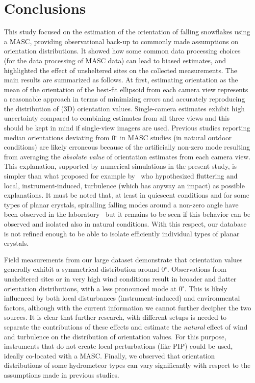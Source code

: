 \documentclass[draft]{agujournal2019}
\begin{document}
\section{Conclusions}
This study focused on the estimation of the orientation of falling snowflakes using a MASC, providing observational back-up to commonly made assumptions on orientation distributions. It showed how some common data processing choices (for the data processing of MASC data) can lead to biased estimates, and highlighted the effect of unsheltered sites on the collected measurements.
The main results are summarized as follows. 
At first, estimating orientation as the mean of the orientation of the best-fit ellipsoid from each camera view represents a reasonable approach in terms of minimizing errors and accurately reproducing the distribution of (3D) orientation values. Single-camera estimates exhibit high uncertainty compared to combining estimates from all three views and this should be kept in mind if single-view imagers are used. Previous studies reporting median orientations deviating from 0$^\circ$ in MASC studies (in natural outdoor conditions) are likely erroneous because of the artificially non-zero mode resulting from averaging the \textit{absolute value} of orientation estimates from each camera view. This explanation, supported by numerical simulations in the present study, is simpler than what proposed for example by~\cite{Garrett_GRL_2015} who hypothesized fluttering and local, instrument-induced, turbulence (which has anyway an impact) as possible explanations. It must be noted that, at least in quiescent conditions and for some types of planar crystals, spiralling falling modes around a non-zero angle have been observed in the laboratory~\cite{Stout_ACP_2024} but it remains to be seen if this behavior can be observed and isolated also in natural conditions. With this respect, our database is not refined enough to be able to isolate efficiently individual types of planar crystals. 

Field measurements from our large dataset demonstrate that orientation values generally exhibit a symmetrical distribution around 0$^\circ$. Observations from unsheltered sites or in very high wind conditions result in broader and flatter orientation distributions, with a less pronounced mode at 0$^\circ$. This is likely influenced by both local disturbances (instrument-induced) and environmental factors, although with the current information we cannot further decipher the two sources.
It is clear that further research, with different setups is needed to separate the contributions of these effects and estimate the \textit{natural} effect of wind and turbulence on the distribution of orientation values. For this purpose, instruments that do not create local perturbations (like PIP) could be used, ideally co-located with a MASC.   Finally, we observed that orientation distributions of some hydrometeor types can vary significantly with respect to the assumptions made in previous studies.
\end{document}
